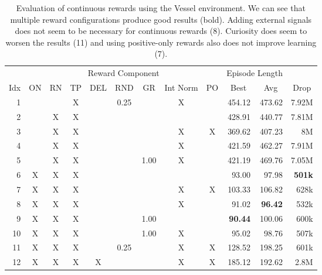\begin{table}[htp]
    \begin{center}
        \begin{tabular}{rccccccccrrr}
            \toprule
             & \multicolumn{8}{c}{Reward Component} & \multicolumn{2}{c}{Episode Length} & \\
            \cmidrule(lr){2-9}\cmidrule(lr){10-11}
            \multicolumn{1}{c}{Idx} & \multicolumn{1}{c}{ON} & \multicolumn{1}{c}{RN} & \multicolumn{1}{c}{TP} & \multicolumn{1}{c}{DEL} & \multicolumn{1}{c}{RND} & \multicolumn{1}{c}{GR} & \multicolumn{1}{c}{Int Norm} & \multicolumn{1}{c}{PO} & \multicolumn{1}{c}{Best} & \multicolumn{1}{c}{Avg} & \multicolumn{1}{c}{Drop}\\
            \midrule
            1 &  &  & X &  & 0.25 &  & X &  & 454.12 & 473.62 & 7.92M \\
            2 &  & X & X &  &  &  &  &  & 428.91 & 440.77 & 7.81M \\
            3 &  & X & X &  &  &  & X & X & 369.62 & 407.23 & 8M \\
            4 &  & X & X &  &  &  & X &  & 421.59 & 462.27 & 7.91M \\
            5 &  & X & X &  &  & 1.00 & X &  & 421.19 & 469.76 & 7.05M \\
            6 & X & X & X &  &  &  &  &  & 93.00 & 97.98 & \textbf{501k} \\
            7 & X & X & X &  &  &  & X & X & 103.33 & 106.82 & 628k \\
            8 & X & X & X &  &  &  & X &  & 91.02 & \textbf{96.42} & 532k \\
            9 & X & X & X &  &  & 1.00 &  &  & \textbf{90.44} & 100.06 & 600k \\
            10 & X & X & X &  &  & 1.00 & X &  & 95.02 & 98.76 & 507k \\
            11 & X & X & X &  & 0.25 &  & X & X & 128.52 & 198.25 & 601k \\
            12 & X & X & X & X &  &  & X & X & 185.12 & 192.62 & 2.8M \\
            \bottomrule
        \end{tabular}
    \end{center}
    \caption[Evaluation of Continuous Rewards using the Vessel Environment]{Evaluation of continuous rewards using the Vessel environment. We can see that multiple reward configurations produce good results (bold). Adding external signals does not seem to be necessary for continuous rewards (8). Curiosity does seem to worsen the results (11) and using positive-only rewards also does not improve learning (7).} \label{tab:VesselMaze02/Reward/Continuous}
\end{table}


